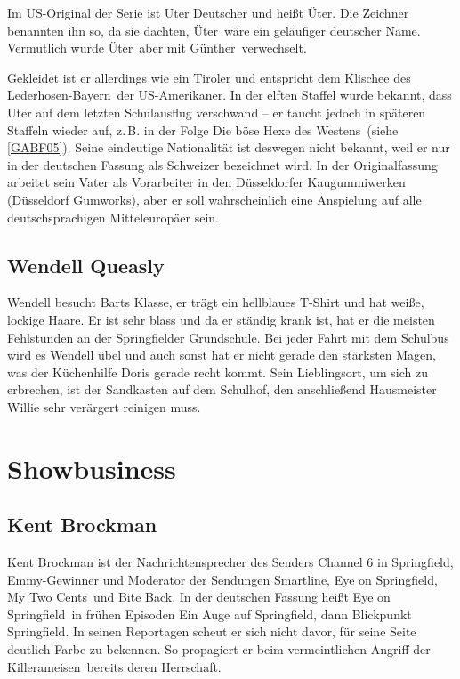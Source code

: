 Im US-Original der Serie ist Uter Deutscher und heißt Üter. Die Zeichner benannten ihn so, da sie dachten, \glqq Üter\grqq\ wäre ein geläufiger deutscher Name. Vermutlich wurde \glqq Üter\grqq\ aber mit \glqq Günther\grqq\ verwechselt.

Gekleidet ist er allerdings wie ein Tiroler und entspricht dem Klischee des \glqq Lederhosen-Bayern\grqq\ der US-Amerikaner. In der elften Staffel wurde bekannt, dass Uter auf dem letzten Schulausflug verschwand -- er taucht jedoch in späteren Staffeln wieder auf, z.\,B. in der Folge \glqq Die böse Hexe des Westens\grqq\ (siehe \ref{GABF05}). Seine eindeutige Nationalität ist deswegen nicht bekannt, weil er nur in der deutschen Fassung als Schweizer bezeichnet wird. In der Originalfassung arbeitet sein Vater als Vorarbeiter in den Düsseldorfer Kaugummiwerken (Düsseldorf Gumworks), aber er soll wahrscheinlich eine Anspielung auf alle deutschsprachigen Mitteleuropäer sein.

\subsection{Wendell Queasly}\label{WendellQueasly}
Wendell besucht Barts Klasse, er trägt ein hellblaues T-Shirt und hat weiße, lockige Haare. Er ist sehr blass und da er ständig krank ist, hat er die meisten Fehlstunden an der Springfielder Grundschule. Bei jeder Fahrt mit dem Schulbus wird es Wendell übel und auch sonst hat er nicht gerade den stärksten Magen, was der Küchenhilfe Doris gerade recht kommt. Sein Lieblingsort, um sich zu erbrechen, ist der Sandkasten auf dem Schulhof, den anschließend Hausmeister Willie sehr verärgert reinigen muss.

\section{Showbusiness}

\subsection{Kent Brockman}\label{KentBrockman}
Kent Brockman ist der Nachrichtensprecher des Senders Channel 6 in Springfield, Emmy-Gewinner und Moderator der Sendungen \glqq Smartline\grqq, \glqq Eye on Springfield\grqq, \glqq My Two Cents\grqq\ und \glqq Bite Back\grqq . In der deutschen Fassung heißt \glqq Eye on Springfield\grqq\ in frühen Episoden \glqq Ein Auge auf Springfield\grqq , dann \glqq Blickpunkt Springfield\grqq . In seinen Reportagen scheut er sich nicht davor, für seine Seite deutlich Farbe zu bekennen. So propagiert er beim vermeintlichen Angriff der \glqq Killerameisen\grqq\ bereits deren Herrschaft. 


